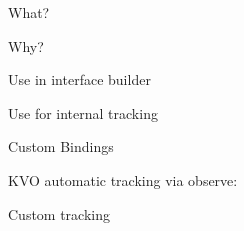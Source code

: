 
\begin{DoxyItemize}
\item What?
\item Why?
\item Use in interface builder
\item Use for internal tracking
\item Custom Bindings
\item K\+V\+O automatic tracking via observe\+:
\item Custom tracking 
\end{DoxyItemize}